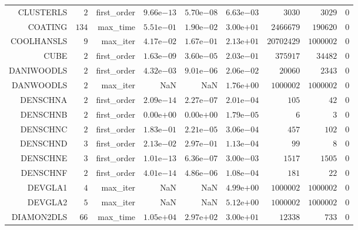 \begin{longtable}{rrrrrrrrr}
CLUSTERLS & \(     2\) & first\_order & \( 9.66\)e\(-13\) & \( 5.70\)e\(-08\) & \( 6.63\)e\(-03\) & \(  3030\) & \(  3029\) & \(     0\) \\
COATING & \(   134\) & max\_time & \( 5.51\)e\(-01\) & \( 1.90\)e\(-02\) & \( 3.00\)e\(+01\) & \(2466679\) & \(190620\) & \(     0\) \\
COOLHANSLS & \(     9\) & max\_iter & \( 4.17\)e\(-02\) & \( 1.67\)e\(-01\) & \( 2.13\)e\(+01\) & \(20702429\) & \(1000002\) & \(     0\) \\
CUBE & \(     2\) & first\_order & \( 1.63\)e\(-09\) & \( 3.60\)e\(-05\) & \( 2.03\)e\(-01\) & \(375917\) & \( 34482\) & \(     0\) \\
DANIWOODLS & \(     2\) & first\_order & \( 4.32\)e\(-03\) & \( 9.01\)e\(-06\) & \( 2.06\)e\(-02\) & \( 20060\) & \(  2343\) & \(     0\) \\
DANWOODLS & \(     2\) & max\_iter &       NaN &       NaN & \( 1.76\)e\(+00\) & \(1000002\) & \(1000002\) & \(     0\) \\
DENSCHNA & \(     2\) & first\_order & \( 2.09\)e\(-14\) & \( 2.27\)e\(-07\) & \( 2.01\)e\(-04\) & \(   105\) & \(    42\) & \(     0\) \\
DENSCHNB & \(     2\) & first\_order & \( 0.00\)e\(+00\) & \( 0.00\)e\(+00\) & \( 1.79\)e\(-05\) & \(     6\) & \(     3\) & \(     0\) \\
DENSCHNC & \(     2\) & first\_order & \( 1.83\)e\(-01\) & \( 2.21\)e\(-05\) & \( 3.06\)e\(-04\) & \(   457\) & \(   102\) & \(     0\) \\
DENSCHND & \(     3\) & first\_order & \( 2.13\)e\(-02\) & \( 2.97\)e\(-01\) & \( 1.13\)e\(-04\) & \(    99\) & \(     8\) & \(     0\) \\
DENSCHNE & \(     3\) & first\_order & \( 1.01\)e\(-13\) & \( 6.36\)e\(-07\) & \( 3.00\)e\(-03\) & \(  1517\) & \(  1505\) & \(     0\) \\
DENSCHNF & \(     2\) & first\_order & \( 4.01\)e\(-14\) & \( 4.86\)e\(-06\) & \( 1.08\)e\(-04\) & \(   181\) & \(    22\) & \(     0\) \\
DEVGLA1 & \(     4\) & max\_iter &       NaN &       NaN & \( 4.99\)e\(+00\) & \(1000002\) & \(1000002\) & \(     0\) \\
DEVGLA2 & \(     5\) & max\_iter &       NaN &       NaN & \( 5.12\)e\(+00\) & \(1000002\) & \(1000002\) & \(     0\) \\
DIAMON2DLS & \(    66\) & max\_time & \( 1.05\)e\(+04\) & \( 2.97\)e\(+02\) & \( 3.00\)e\(+01\) & \( 12338\) & \(   733\) & \(     0\) \\

\end{longtable}
